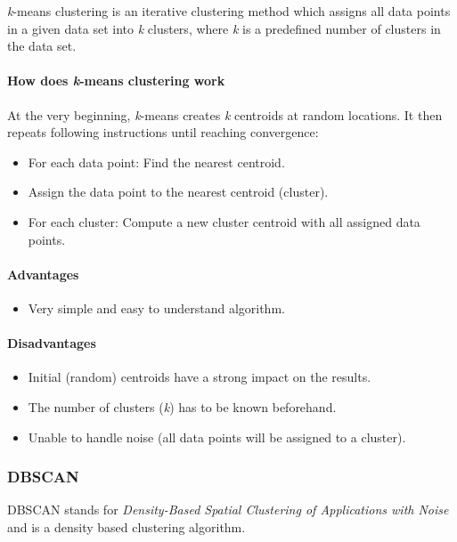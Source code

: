 \textit{k}-means clustering is an iterative clustering method which assigns all data points in a given data set
into \textit{k} clusters, where \textit{k} is a predefined number of clusters in the data set.

\paragraph{How does \textit{k}-means clustering work}
At the very beginning, \textit{k}-means creates \textit{k} centroids at random locations.
It then repeats following instructions until reaching convergence:

\begin{itemize}
    \item For each data point: Find the nearest centroid.
    \item Assign the data point to the nearest centroid (cluster).
    \item For each cluster: Compute a new cluster centroid with all assigned data points.
\end{itemize}

\paragraph{Advantages}
\begin{itemize}
    \item Very simple and easy to understand algorithm.
\end{itemize}

\paragraph{Disadvantages}
\begin{itemize}
    \item Initial (random) centroids have a strong impact on the results.
    \item The number of clusters (\textit{k}) has to be known beforehand.
    \item Unable to handle noise (all data points will be assigned to a cluster).
\end{itemize}

\subsubsection{DBSCAN}
\label{subsubsec:3_dbscan}

DBSCAN stands for \textit{Density-Based Spatial Clustering of Applications with Noise}
and is a density based clustering algorithm.

